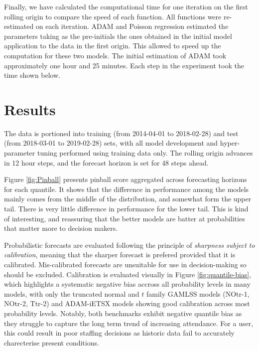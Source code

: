 \documentclass[]{elsarticle} %
\begin{document}
Finally, we have calculated the computational time for one iteration on the first rolling origin to compare the speed of each function. All functions were re-estimated on each iteration. ADAM and Poisson regression estimated the parameters taking as the pre-initials the ones obtained in the initial model application to the data in the first origin. This allowed to speed up the computation for these two models. The initial estimation of ADAM took approximately one hour and 25 minutes. Each step in the experiment took the time shown below.

\hypertarget{result}{%
\section{Results}\label{result}}

The data is portioned into training (from 2014-04-01 to 2018-02-28) and test (from 2018-03-01 to 2019-02-28) sets, with all model development and hyper-parameter tuning performed using training data only. The rolling origin advances in 12 hour steps, and the forecast horizon is set for 48 steps ahead.

Figure \ref{fig:Pinball} presents pinball score aggregated across forecasting horizons for each quantile. It shows that the difference in performance among the models mainly comes from the middle of the distribution, and somewhat form the upper tail. There is very little difference in performance for the lower tail. This is kind of interesting, and reassuring that the better models are batter at probabilities that matter more to decision makers.

Probabilistic forecasts are evaluated following the principle of \emph{sharpness subject to calibration}, meaning that the sharper forecast is prefered provided that it is calibrated. Mis-calibrated forecasts are unsuitable for use in decision-making so should be excluded. Calibration is evaluated visually in Figure \ref{fig:quantile-bias}, which highlights a systematic negative bias accross all probability levels in many models, with only the truncated normal and \(t\) family GAMLSS models (NOtr-1, NOtr-2, Ttr-2) and ADAM-iETSX models showing good calibration across most probability levels. Notably, both benchmarks exhibit negative quantile bias as they struggle to capture the long term trend of increasing attendance. For a user, this could result in poor staffing decisions as historic data fail to accurately charecterise present conditions.
\end{document}
